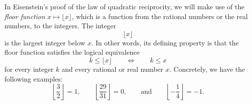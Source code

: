 In Eisenstein's proof of the law of quadratic reciprocity, we will make use of the \emph{floor function} $x\mapsto \lfloor x\rfloor$, which is a function from the rational numbers or the real numbers, to the integers. The integer
\begin{equation*}
  \lfloor x\rfloor
\end{equation*}
is the largest integer below $x$. In other words, its defining property is that the floor function satisfies the logical equivalence
\begin{equation*}
  k\leq \lfloor x\rfloor\qquad\Leftrightarrow \qquad k\leq x
\end{equation*}
for every integer $k$ and every rational or real number $x$. Concretely, we have the following examples:
\begin{equation*}
  \left\lfloor\frac{3}{2}\right\rfloor=1,\qquad \left\lfloor\frac{29}{31}\right\rfloor=0,\qquad\text{and}\qquad\left\lfloor-\frac{1}{4}\right\rfloor=-1.
\end{equation*}

